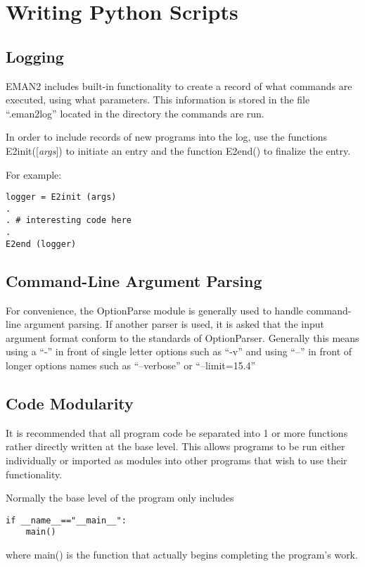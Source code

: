 \section{Writing Python Scripts}
\label{WRITING-PYTHON-SCRIPTS} 

\subsection{Logging}
    EMAN2 includes built-in functionality to create a record of
    what commands are executed, using what parameters.  This
    information is stored in the file ``.eman2log'' located in the directory
    the commands are run.  

    In order to include records of new programs into the log, use the functions
    E2init([\textit{args}]) to initiate an entry and the function
    E2end() to finalize the entry.

    For example:\begin{verbatim}
logger = E2init (args)
.
. # interesting code here
.
E2end (logger)
\end{verbatim}

\subsection{Command-Line Argument Parsing}
    For convenience, the OptionParse module is generally used to handle
    command-line argument parsing.  If another parser is used, it is
    asked that the input argument format conform to the standards of
    OptionParser. Generally this means using a ``-'' in front of
    single letter options such as ``-v'' and using ``--'' in front of
    longer options names such as ``--verbose'' or ``--limit=15.4''

\subsection{Code Modularity}
    It is recommended that all program code be separated into
    1 or more functions rather directly written at the base level.  This allows
    programs to be run either individually or imported as modules into
    other programs that wish to use their functionality.

    Normally the base level of the program only includes
    \begin{verbatim}if __name__=="__main__":
    main()\end{verbatim}
    where main() is the function that actually begins completing the
    program's work.
    